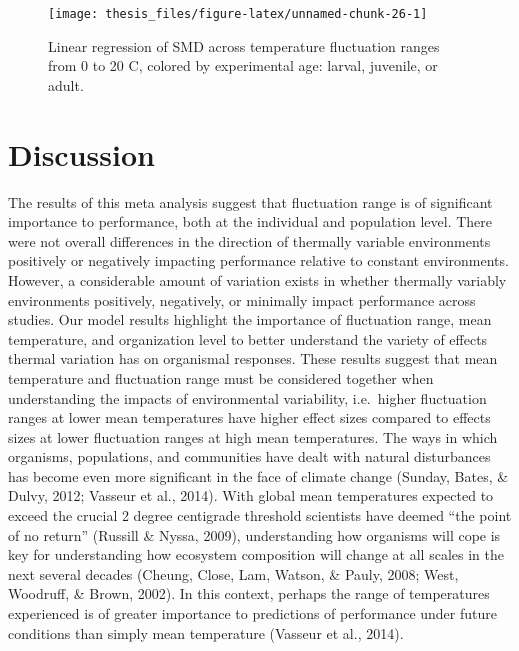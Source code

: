 \documentclass[12pt,twoside]{reedthesis}
\begin{document}
\begin{figure}

{\centering \texttt{[image: thesis\_files/figure-latex/unnamed-chunk-26-1]} 

}

\caption[Effect sizes across temperature range by experimental age]{Linear regression of SMD across temperature fluctuation ranges from 0 to 20 C, colored by experimental age: larval, juvenile, or adult.}\label{fig:unnamed-chunk-26}
\end{figure}
\hypertarget{discussion}{%
\chapter{Discussion}\label{discussion}}

The results of this meta analysis suggest that fluctuation range is of significant importance to performance, both at the individual and population level. There were not overall differences in the direction of thermally variable environments positively or negatively impacting performance relative to constant environments. However, a considerable amount of variation exists in whether thermally variably environments positively, negatively, or minimally impact performance across studies. Our model results highlight the importance of fluctuation range, mean temperature, and organization level to better understand the variety of effects thermal variation has on organismal responses. These results suggest that mean temperature and fluctuation range must be considered together when understanding the impacts of environmental variability, i.e.~higher fluctuation ranges at lower mean temperatures have higher effect sizes compared to effects sizes at lower fluctuation ranges at high mean temperatures. The ways in which organisms, populations, and communities have dealt with natural disturbances has become even more significant in the face of climate change (Sunday, Bates, \& Dulvy, 2012; Vasseur et al., 2014). With global mean temperatures expected to exceed the crucial 2 degree centigrade threshold scientists have deemed ``the point of no return'' (Russill \& Nyssa, 2009), understanding how organisms will cope is key for understanding how ecosystem composition will change at all scales in the next several decades (Cheung, Close, Lam, Watson, \& Pauly, 2008; West, Woodruff, \& Brown, 2002). In this context, perhaps the range of temperatures experienced is of greater importance to predictions of performance under future conditions than simply mean temperature (Vasseur et al., 2014).
\end{document}
